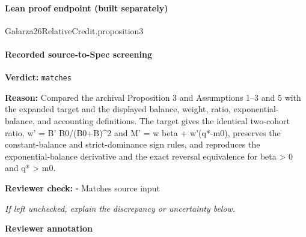 \documentclass[10pt]{article}
\newcommand{\reviewerbox}{%
  \par\noindent\fbox{\parbox{0.96\linewidth}{\rule{0pt}{0.38in}}}\par
}
\newcommand{\reviewmatch}[1]{%
  \par\noindent\textbf{Reviewer check:} $\square$\; #1\par
  \noindent\emph{If left unchecked, explain the discrepancy or uncertainty below.}\par
}
\begin{document}
\paragraph{Lean proof endpoint (built separately)}\begin{ReviewVerbatim}
Galarza26RelativeCredit.proposition3
\end{ReviewVerbatim}

\paragraph{Recorded source-to-Spec screening}
\textbf{Verdict:} \texttt{matches}
\\
{\raggedright
\textbf{Reason:} Compared the archival Proposition 3 and Assumptions 1–3 and 5 with the expanded target and the displayed balance, weight, ratio, exponential-\allowbreak{}balance, and accounting definitions.\allowbreak{} The target gives the identical two-\allowbreak{}cohort ratio, w' = B' B0/\allowbreak{}(B0+B)\textasciicircum{}2 and M' = w beta + w'(q*-\allowbreak{}m0), preserves the constant-\allowbreak{}balance and strict-\allowbreak{}dominance sign rules, and reproduces the exponential-\allowbreak{}balance derivative and the exact reversal equivalence for beta > 0 and q* > m0.\allowbreak{}
\par}
\reviewmatch{Matches source input}
\noindent\textbf{Reviewer annotation}\par
\reviewerbox
\end{document}
